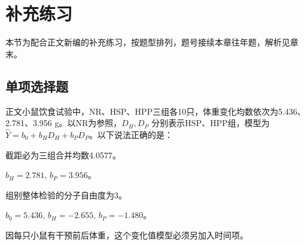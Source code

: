 \clearpage\section{补充练习}

本节为配合正文新编的补充练习，按题型排列，题号接续本章往年题，解析见章末。

\subsection{单项选择题}

\par\addvspace{6pt}\noindent\begin{minipage}{\linewidth}


正文小鼠饮食试验中，NR、HSP、HPP三组各10只，体重变化均数依次为5.436、2.781、3.956 g。以NR为参照，\(D_H,D_P\) 分别表示HSP、HPP组，模型为 \(\hat Y=b_0+b_HD_H+b_PD_P\)。以下说法正确的是：


\begin{choices}

\item 截距必为三组合并均数4.0577。

\item \(b_H=2.781,\,b_P=3.956\)。

\item 组别整体检验的分子自由度为3。

\item \(b_0=5.436,\,b_H=-2.655,\,b_P=-1.480\)。

\item 因每只小鼠有干预前后体重，这个变化值模型必须另加入时间项。

\end{choices}

\end{minipage}\par\vspace{4pt}

